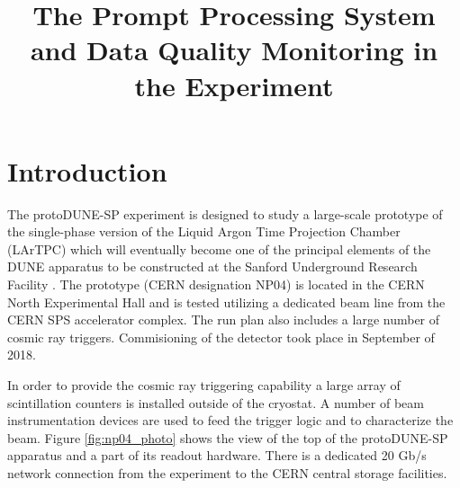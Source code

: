 \documentclass[pdftex,12pt,letter]{article}
\newcommand{\pd}{protoDUNE\xspace}
\begin{document}
%
\title{The Prompt Processing System and Data Quality Monitoring in the Experiment}


\author{}

%
\maketitle
%
\section{Introduction}
\label{sec:intro}
The \pd-SP experiment is designed to study a large-scale prototype of the single-phase version of
the Liquid Argon Time Projection Chamber (LArTPC) which will eventually become one of
the principal elements of the DUNE apparatus to be constructed at the Sanford Underground
Research Facility \cite{cdrVol1, cdrVol4}. The prototype (CERN designation NP04) is located
in the CERN North Experimental Hall and is tested utilizing a dedicated beam line from the CERN SPS
accelerator complex. The run plan also includes a large number of cosmic ray triggers.
Commisioning of the detector took place in September of 2018.



In order to provide the cosmic ray triggering capability a large array of scintillation
counters is installed outside of the cryostat. A number of beam instrumentation devices
are used to feed the  trigger logic and to characterize the beam. Figure \ref{fig:np04_photo}
shows the view of the top of the \pd-SP apparatus and a part of its readout hardware.
There is a dedicated 20 Gb/s network connection from the experiment to the CERN central storage facilities.
\end{document}
